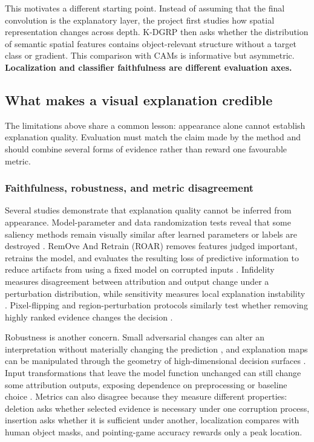 This motivates a different starting point. Instead of assuming that the final
convolution is the explanatory layer, the project first studies how spatial
representation changes across depth. K-DGRP then asks whether the distribution
of semantic spatial features contains object-relevant structure without a
target class or gradient. This comparison with CAMs is informative but
asymmetric. \textbf{Localization and classifier faithfulness are different
evaluation axes.}

\subsection{What makes a visual explanation credible}

The limitations above share a common lesson: appearance alone cannot establish
explanation quality. Evaluation must match the claim made by the method and
should combine several forms of evidence rather than reward one favourable
metric.

\subsubsection{Faithfulness, robustness, and metric disagreement}

Several studies demonstrate that explanation quality cannot be inferred from
appearance. Model-parameter and data randomization tests reveal that some
saliency methods remain visually similar after learned parameters or labels are
destroyed \cite{adebayo2018sanity}. RemOve And Retrain (ROAR) removes features
judged important, retrains the model, and evaluates the resulting loss of predictive information
to reduce artifacts from using a fixed model on corrupted inputs
\cite{hooker2019roar}. Infidelity measures disagreement between attribution and
output change under a perturbation distribution, while sensitivity measures
local explanation instability \cite{yeh2019infidelity}. Pixel-flipping and
region-perturbation protocols similarly test whether removing highly ranked
evidence changes the decision \cite{samek2017evaluating}.

Robustness is another concern. Small adversarial changes can alter an
interpretation without materially changing the prediction
\cite{ghorbani2019fragile}, and explanation maps can be manipulated through
the geometry of high-dimensional decision surfaces
\cite{dombrowski2019explanations}. Input transformations that leave the model
function unchanged can still change some attribution outputs, exposing
dependence on preprocessing or baseline choice
\cite{kindermans2019unreliability}. Metrics can also disagree because they
measure different properties: deletion asks whether selected evidence is
necessary under one corruption process, insertion asks whether it is
sufficient under another, localization compares with human object masks, and
pointing-game accuracy rewards only a peak location.

